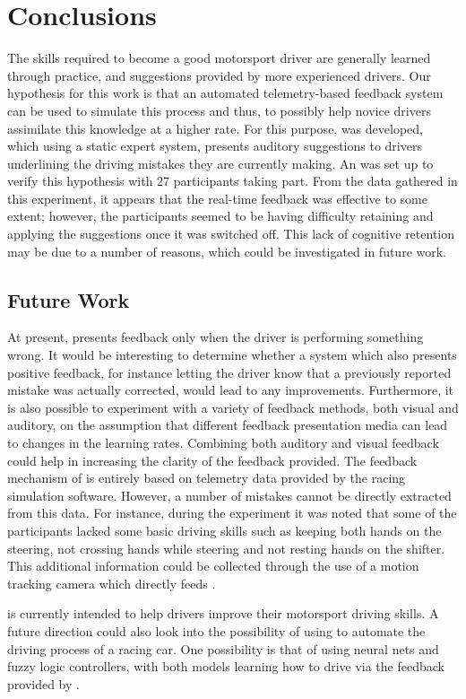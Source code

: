 \documentclass{sig-alternate}
\begin{document}
\section{Conclusions} {
\label{sec:Conclusions}
The skills required to become a good motorsport driver are generally learned through practice, and suggestions provided by more experienced drivers. Our hypothesis for this work is that an automated telemetry-based feedback system can be used to simulate this process and thus, to possibly help novice drivers assimilate this knowledge at a higher rate. For this purpose, \methodname was developed, which using a static expert system, presents auditory suggestions to drivers underlining the driving mistakes they are currently making. An was set up to verify this hypothesis with 27 participants taking part. From the data gathered in this experiment, it appears that the real-time feedback was effective to some extent; however, the participants seemed to be having difficulty retaining and applying the suggestions once it was switched off. This lack of cognitive retention may be due to a number of reasons, which could be investigated in future work.

\subsection{Future Work}
At present, \methodname presents feedback only when the driver is performing something wrong. It would be interesting to determine whether a system which also presents positive feedback, for instance letting the driver know that a previously reported mistake was actually corrected, would lead to any improvements. Furthermore, it is also possible to experiment with a variety of feedback methods, both visual and auditory, on the assumption that different feedback presentation media can lead to changes in the learning rates. Combining both auditory and visual feedback could help in increasing the clarity of the feedback provided. The feedback mechanism of \methodname is entirely based on telemetry data provided by the racing simulation software. However, a number of mistakes cannot be directly extracted from this data. For instance, during the experiment it was noted that some of the participants lacked some basic driving skills such as keeping both hands on the steering, not crossing hands while steering and not resting hands on the shifter. This additional information could be collected through the use of a motion tracking camera which directly feeds \methodname.   

\methodname is currently intended to help drivers improve their motorsport driving skills. A future direction could also look into the possibility of using \methodname to automate the driving process of a racing car. One possibility is that of using neural nets and fuzzy logic controllers, with both models learning how to drive via the feedback provided by \methodname.

}



\end{document}
